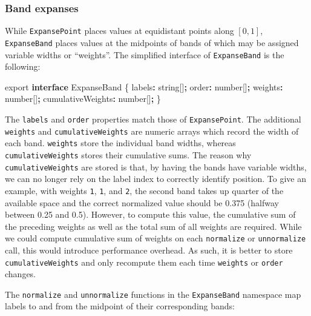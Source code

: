 \documentclass[
  openany]{book}
\newenvironment{Shaded}{\begin{snugshade}}{\end{snugshade}}
\newcommand{\DataTypeTok}[1]{\textcolor[rgb]{0.13,0.29,0.53}{#1}}
\newcommand{\ImportTok}[1]{#1}
\newcommand{\KeywordTok}[1]{\textcolor[rgb]{0.13,0.29,0.53}{\textbf{#1}}}
\newcommand{\NormalTok}[1]{#1}
\newcommand{\OperatorTok}[1]{\textcolor[rgb]{0.81,0.36,0.00}{\textbf{#1}}}
\theoremstyle{definition}
\theoremstyle{definition}
\theoremstyle{definition}
\theoremstyle{definition}
\theoremstyle{remark}
\begin{document}
\subsubsection{Band expanses}\label{band-expanses}

While \texttt{ExpansePoint} places values at equidistant points along \([0, 1]\), \texttt{ExpanseBand} places values at the midpoints of bands of which may be assigned variable widths or ``weights''. The simplified interface of \texttt{ExpanseBand} is the following:

\begin{Shaded}
\begin{Highlighting}[]
\ImportTok{export} \KeywordTok{interface}\NormalTok{ ExpanseBand \{}
\NormalTok{  labels}\OperatorTok{:} \DataTypeTok{string}\NormalTok{[]}\OperatorTok{;}
\NormalTok{  order}\OperatorTok{:} \DataTypeTok{number}\NormalTok{[]}\OperatorTok{;}
\NormalTok{  weights}\OperatorTok{:} \DataTypeTok{number}\NormalTok{[]}\OperatorTok{;}
\NormalTok{  cumulativeWeights}\OperatorTok{:} \DataTypeTok{number}\NormalTok{[]}\OperatorTok{;}
\NormalTok{\}}
\end{Highlighting}
\end{Shaded}

The \texttt{labels} and \texttt{order} properties match those of \texttt{ExpansePoint}. The additional \texttt{weights} and \texttt{cumulativeWeights} are numeric arrays which record the width of each band. \texttt{weights} store the individual band widths, whereas \texttt{cumulativeWeights} stores their cumulative sums. The reason why \texttt{cumulativeWeights} are stored is that, by having the bands have variable widths, we can no longer rely on the label index to correctly identify position. To give an example, with weights \texttt{1}, \texttt{1}, and \texttt{2}, the second band takes up quarter of the available space and the correct normalized value should be 0.375 (halfway between 0.25 and 0.5). However, to compute this value, the cumulative sum of the preceding weights as well as the total sum of all weights are required. While we could compute cumulative sum of weights on each \texttt{normalize} or \texttt{unnormalize} call, this would introduce performance overhead. As such, it is better to store \texttt{cumulativeWeights} and only recompute them each time \texttt{weights} or \texttt{order} changes.

The \texttt{normalize} and \texttt{unnormalize} functions in the \texttt{ExpanseBand} namespace map labels to and from the midpoint of their corresponding bands:
\end{document}
